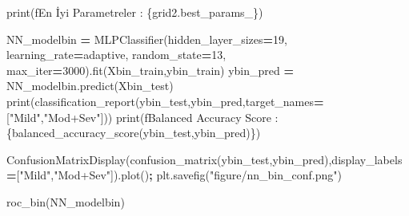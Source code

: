 \documentclass[12pt,twoside]{deuthesis}
\newenvironment{Shaded}{\begin{snugshade}}{\end{snugshade}}
\newcommand{\BuiltInTok}[1]{#1}
\newcommand{\DecValTok}[1]{\textcolor[rgb]{0.00,0.00,0.81}{#1}}
\newcommand{\NormalTok}[1]{#1}
\newcommand{\OperatorTok}[1]{\textcolor[rgb]{0.81,0.36,0.00}{\textbf{#1}}}
\newcommand{\SpecialCharTok}[1]{\textcolor[rgb]{0.00,0.00,0.00}{#1}}
\newcommand{\SpecialStringTok}[1]{\textcolor[rgb]{0.31,0.60,0.02}{#1}}
\newcommand{\StringTok}[1]{\textcolor[rgb]{0.31,0.60,0.02}{#1}}
\begin{document}
\begin{Shaded}
\begin{Highlighting}[]
\BuiltInTok{print}\NormalTok{(}\SpecialStringTok{f\textquotesingle{}En İyi Parametreler : }\SpecialCharTok{\{}\NormalTok{grid2}\SpecialCharTok{.}\NormalTok{best\_params\_}\SpecialCharTok{\}}\SpecialStringTok{\textquotesingle{}}\NormalTok{)}
\end{Highlighting}
\end{Shaded}
\begin{Shaded}
\begin{Highlighting}[]
\NormalTok{NN\_modelbin }\OperatorTok{=}\NormalTok{ MLPClassifier(hidden\_layer\_sizes}\OperatorTok{=}\DecValTok{19}\NormalTok{,}
\NormalTok{                            learning\_rate}\OperatorTok{=}\StringTok{\textquotesingle{}adaptive\textquotesingle{}}\NormalTok{,}
\NormalTok{                            random\_state}\OperatorTok{=}\DecValTok{13}\NormalTok{,}
\NormalTok{                            max\_iter}\OperatorTok{=}\DecValTok{3000}\NormalTok{).fit(Xbin\_train,ybin\_train)}
\NormalTok{ybin\_pred }\OperatorTok{=}\NormalTok{ NN\_modelbin.predict(Xbin\_test)}
\BuiltInTok{print}\NormalTok{(classification\_report(ybin\_test,ybin\_pred,target\_names}\OperatorTok{=}\NormalTok{[}\StringTok{"Mild"}\NormalTok{,}\StringTok{"Mod+Sev"}\NormalTok{]))}
\BuiltInTok{print}\NormalTok{(}\SpecialStringTok{f\textquotesingle{}Balanced Accuracy Score : }\SpecialCharTok{\{}\NormalTok{balanced\_accuracy\_score(ybin\_test,ybin\_pred)}\SpecialCharTok{\}}\SpecialStringTok{\textquotesingle{}}\NormalTok{)}
\end{Highlighting}
\end{Shaded}
\begin{Shaded}
\begin{Highlighting}[]
\NormalTok{ConfusionMatrixDisplay(confusion\_matrix(ybin\_test,ybin\_pred),display\_labels}\OperatorTok{=}\NormalTok{[}\StringTok{"Mild"}\NormalTok{,}\StringTok{"Mod+Sev"}\NormalTok{]).plot()}\OperatorTok{;}
\NormalTok{plt.savefig(}\StringTok{"figure/nn\_bin\_conf.png"}\NormalTok{)}
\end{Highlighting}
\end{Shaded}
\begin{Shaded}
\begin{Highlighting}[]
\NormalTok{roc\_bin(NN\_modelbin)}
\end{Highlighting}
\end{Shaded}
\end{document}
